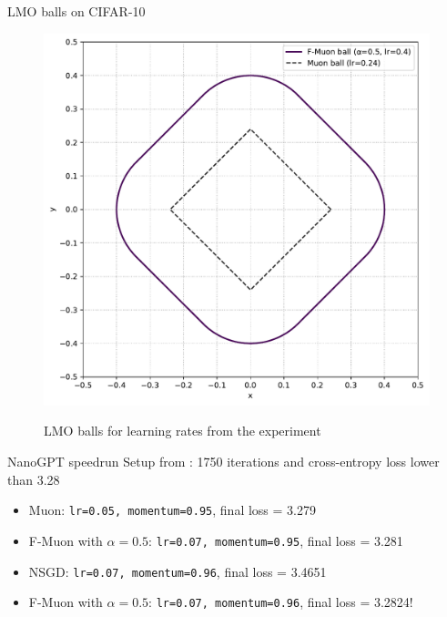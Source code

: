 \documentclass[aspectratio=169]{beamer}
\begin{document}
\begin{frame}{LMO balls on CIFAR-10}
  \begin{figure}[t]
    \includegraphics[height=0.7\textheight]{fstardual_cifar.pdf}
    \centering

    \footnotesize LMO balls for learning rates from the experiment

  \end{figure}
\end{frame}
\begin{frame}{NanoGPT speedrun}
  Setup from \citet{modded_nanogpt_2024}: 1750 iterations and cross-entropy loss lower than 3.28
    \begin{itemize}
      \item Muon: {\tt lr=0.05, momentum=0.95}, final loss = 3.279
      \item F-Muon with \(\alpha=0.5\): {\tt lr=0.07, momentum=0.95}, final loss = 3.281
      \item NSGD: {\tt lr=0.07, momentum=0.96}, final loss = 3.4651
      \item F-Muon with $\alpha=0.5$: {\tt lr=0.07, momentum=0.96}, final loss = 3.2824!
    \end{itemize}
\end{frame}
\end{document}
